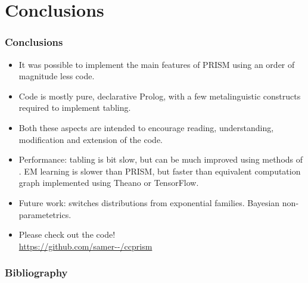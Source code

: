 \documentclass[usenames,dvipsnames]{beamer}
\newenvironment{bframe}[1][untitled]{\begin{frame}[allowframebreaks]\frametitle{#1}}{\end{frame}}
\newenvironment{iframe}[1][untitled]{\begin{frame}\frametitle{#1}}{\end{frame}}
\begin{document}
\section{Conclusions}
	\begin{iframe}[Conclusions]
    \begin{itemize}
      \item<+->It was possible to implement the main features of PRISM using an order of magnitude less code.

      \item<+->Code is mostly pure, declarative Prolog, with a few metalinguistic constructs required to implement tabling.

      \item<+->Both these aspects are intended to encourage reading, understanding, modification and extension of the code.

      \item<+->Performance: tabling is bit slow, but can be much improved using methods of \citet{Abdallah2017b}. EM learning 
        is slower than PRISM, but faster than equivalent computation graph implemented using Theano or TensorFlow.

      \item<+->Future work: switches distributions from exponential families. Bayesian non-parametetrics.

      \item<+->Please check out the code!\\\url{https://github.com/samer--/ccprism}
\end{itemize}
\end{iframe}

	\begin{bframe}[Bibliography]
    \printbibliography
	\end{bframe}
\end{document}
